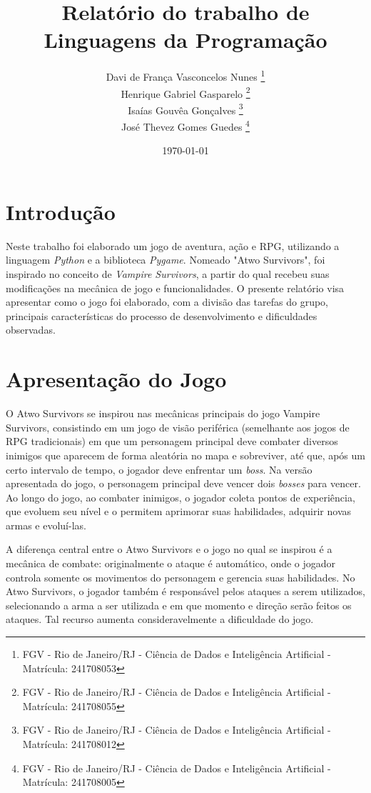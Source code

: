 \documentclass[a4paper,12pt]{article}
\title{Relatório do trabalho de Linguagens da Programação}
\author{
        Davi de França Vasconcelos Nunes
        \footnote{FGV - Rio de Janeiro/RJ  - Ciência de Dados e Inteligência Artificial - Matrícula: 241708053} \\
        Henrique Gabriel Gasparelo 
        \footnote{FGV - Rio de Janeiro/RJ - Ciência de Dados e              Inteligência Artificial - Matrícula: 241708055} \\
        Isaías Gouvêa Gonçalves
        \footnote{FGV - Rio de Janeiro/RJ - Ciência de Dados e Inteligência Artificial - Matrícula: 241708012} \\
        José Thevez Gomes Guedes
        \footnote{FGV - Rio de Janeiro/RJ - Ciência de Dados e Inteligência Artificial - Matrícula: 241708005} \\
        }
\date{\today}
\begin{document}
\maketitle
\vspace{-1cm}

\tableofcontents

\newpage

\section{Introdução} 

Neste trabalho foi elaborado um jogo de aventura, ação e RPG, utilizando a linguagem \textit{Python} e a biblioteca \textit{Pygame}. Nomeado "Atwo Survivors", foi inspirado no conceito de \textit{Vampire Survivors}, a partir do qual recebeu suas modificações na mecânica de jogo e funcionalidades. O presente relatório visa apresentar como o jogo foi elaborado, com a divisão das tarefas do grupo, principais características do processo de desenvolvimento e dificuldades observadas.


\section{Apresentação do Jogo}

O Atwo Survivors se inspirou nas mecânicas principais do jogo Vampire Survivors, consistindo em um jogo de visão periférica (semelhante aos jogos de RPG tradicionais) em que um personagem principal deve combater diversos inimigos que aparecem de forma aleatória no mapa e sobreviver, até que, após um certo intervalo de tempo, o jogador deve enfrentar um \textit{boss}. Na versão apresentada do jogo, o personagem principal deve vencer dois \textit{bosses} para vencer. Ao longo do jogo, ao combater inimigos, o jogador coleta pontos de experiência, que evoluem seu nível e o permitem aprimorar suas habilidades, adquirir novas armas e evoluí-las.

A diferença central entre o Atwo Survivors e o jogo no qual se inspirou é a mecânica de combate: originalmente o ataque é automático, onde o jogador controla somente os movimentos do personagem e gerencia suas habilidades. No Atwo Survivors, o jogador também é responsável pelos ataques a serem utilizados, selecionando a arma a ser utilizada e em que momento e direção serão feitos os ataques. Tal recurso aumenta consideravelmente a dificuldade do jogo.
\end{document}
